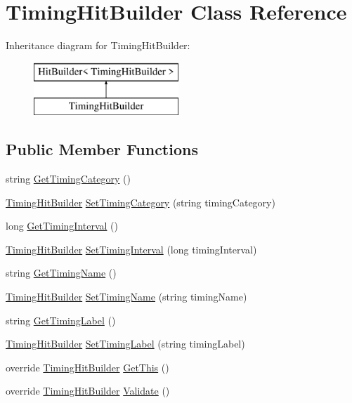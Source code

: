 \hypertarget{class_timing_hit_builder}{}\section{Timing\+Hit\+Builder Class Reference}
\label{class_timing_hit_builder}
Inheritance diagram for Timing\+Hit\+Builder\+:\begin{figure}[H]
\begin{center}
\leavevmode
\includegraphics[height=2.000000cm]{class_timing_hit_builder}
\end{center}
\end{figure}
\subsection*{Public Member Functions}
\begin{DoxyCompactItemize}
\item 
string \hyperlink{class_timing_hit_builder_a1096a3db294f47f76e492e4f97d265c9}{Get\+Timing\+Category} ()
\item 
\hyperlink{class_timing_hit_builder}{Timing\+Hit\+Builder} \hyperlink{class_timing_hit_builder_a2b1d7f29c5b376b4ce582dc03740f27d}{Set\+Timing\+Category} (string timing\+Category)
\item 
long \hyperlink{class_timing_hit_builder_a952416c97709b9132fcecc61cae0e01d}{Get\+Timing\+Interval} ()
\item 
\hyperlink{class_timing_hit_builder}{Timing\+Hit\+Builder} \hyperlink{class_timing_hit_builder_a7cc336ab49ab2aec81a7fd19000bb45e}{Set\+Timing\+Interval} (long timing\+Interval)
\item 
string \hyperlink{class_timing_hit_builder_ae1342fd81c3686b42ee64c1b1f5e40b7}{Get\+Timing\+Name} ()
\item 
\hyperlink{class_timing_hit_builder}{Timing\+Hit\+Builder} \hyperlink{class_timing_hit_builder_a58b093d4c3d2ef9bc28ca6e889ddb280}{Set\+Timing\+Name} (string timing\+Name)
\item 
string \hyperlink{class_timing_hit_builder_ab6549244699c98938cf021f7ca9bf876}{Get\+Timing\+Label} ()
\item 
\hyperlink{class_timing_hit_builder}{Timing\+Hit\+Builder} \hyperlink{class_timing_hit_builder_af0b930098de4687376d35023063d8b80}{Set\+Timing\+Label} (string timing\+Label)
\item 
override \hyperlink{class_timing_hit_builder}{Timing\+Hit\+Builder} \hyperlink{class_timing_hit_builder_a2a40227ad34afd876afb06c316d5d00a}{Get\+This} ()
\item 
override \hyperlink{class_timing_hit_builder}{Timing\+Hit\+Builder} \hyperlink{class_timing_hit_builder_ad8ac9c4003cc9d865198f01acb7f81bd}{Validate} ()
\end{DoxyCompactItemize}


